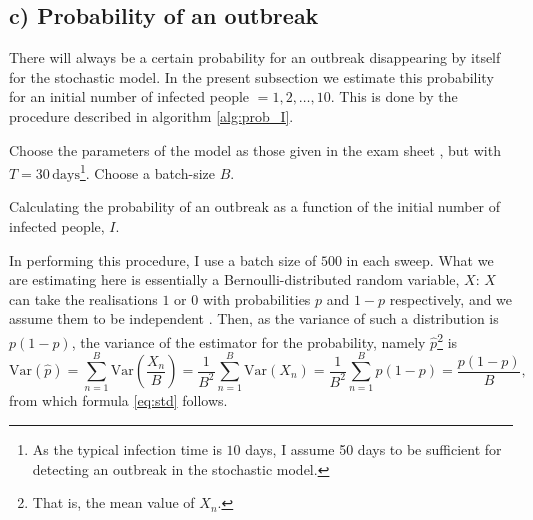 \subsection{c) Probability of an outbreak}

There will always be a certain probability for an outbreak disappearing by itself for the stochastic model. In the present subsection we estimate this probability for an initial number of infected people $=1,2,\dots,10$. This is done by the procedure described in algorithm \ref{alg:prob_I}.

\begin{algorithm}[htb]
	Choose the parameters of the model as those given in the exam sheet \cite{sheet}, but with $T = 30 \, \mathrm{days}$\footnote{As the typical infection time is $10$ days, I assume 50 days to be sufficient for detecting an outbreak in the stochastic model.}. \;
	Choose a batch-size $B$.\;
	\caption{Calculating the probability of an outbreak as a function of the initial number of infected people, $I$. }
	\label{alg:prob_I}
\end{algorithm} 

In performing this procedure, I use a batch size of $500$ in each sweep. What we are estimating here is essentially a Bernoulli-distributed random variable, $X$: $X$ can take the realisations $1$ or $0$ with probabilities $p$ and $1-p$ respectively, and we assume them to be independent \cite[~p.26]{Wassermann}. Then, as the variance of such a distribution is $p(1-p)$, the variance of the estimator for the probability, namely $\hat{p}$\footnote{That is, the mean value of $X_n$.} is 
$$
	\mathrm{Var}(\hat{p}) =  \sum_{n= 1}^{B} \mathrm{Var}\left(\frac{X_n}{B}\right) = \frac{1}{B^2} \sum_{n= 1}^{B} \mathrm{Var}(X_n) = \frac{1}{B^2} \sum_{n= 1}^{B} p (1-p) = \frac{p(1-p)}{B},
$$
from which formula \eqref{eq:std} follows. 

